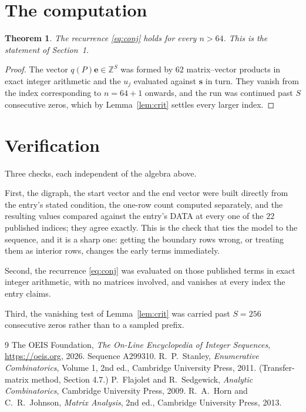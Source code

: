 \documentclass[11pt,a4paper]{article}
\theoremstyle{plain}
\newtheorem{theorem}{Theorem}
\theoremstyle{definition}
\begin{document}
\section{The computation}

\begin{theorem}
The recurrence \eqref{eq:conj} holds for every $n>64$. This is the statement of
Section~1.
\end{theorem}

\begin{proof}
The vector $q(P)\mathbf{e}\in\mathbb{Z}^{S}$ was formed by $62$ matrix--vector
products in exact integer arithmetic and the $u_j$ evaluated against $\mathbf{s}$ in turn.
They vanish from the index corresponding to $n=64+1$ onwards, and the run was continued
past $S$ consecutive zeros, which by Lemma~\ref{lem:crit} settles every larger index.
\end{proof}

\section{Verification}

Three checks, each independent of the algebra above.

First, the digraph, the start vector and the end vector were built directly from the
entry's stated condition, the one-row count computed separately, and the resulting values
compared against the entry's DATA at every one of the $22$ published indices; they
agree exactly. This is the check that ties the model to the sequence, and it is a sharp one:
getting the boundary rows wrong, or treating them as interior rows, changes the early terms
immediately.

Second, the recurrence \eqref{eq:conj} was evaluated on those published terms in exact
integer arithmetic, with no matrices involved, and vanishes at every index the entry claims.

Third, the vanishing test of Lemma~\ref{lem:crit} was carried past $S=256$ consecutive
zeros rather than to a sampled prefix.

\begin{thebibliography}{9}
 The OEIS Foundation, \emph{The On-Line Encyclopedia of Integer
Sequences}, \url{https://oeis.org}, 2026. Sequence A299310.
 R.~P.~Stanley, \emph{Enumerative Combinatorics}, Volume 1, 2nd ed.,
Cambridge University Press, 2011. (Transfer-matrix method, Section 4.7.)
 P.~Flajolet and R.~Sedgewick, \emph{Analytic Combinatorics}, Cambridge
University Press, 2009.
 R.~A.~Horn and C.~R.~Johnson, \emph{Matrix Analysis}, 2nd ed., Cambridge
University Press, 2013.
\end{thebibliography}
\end{document}

